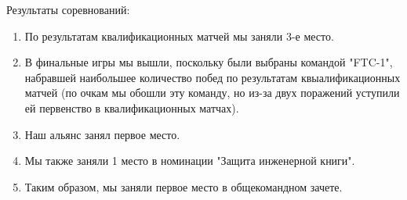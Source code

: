 Результаты соревнований:
\begin{enumerate}
	\item По результатам квалификационных матчей мы заняли 3-е место.
	
	\item В финальные игры мы вышли, поскольку были выбраны командой "FTC-1", набравшей наибольшее количество побед по результатам квыалификационных матчей (по очкам мы обошли эту команду, но из-за двух поражений уступили ей первенство в квалификационных матчах).
	
	\item Наш альянс занял первое место.
	
	\item Мы также заняли 1 место в номинации "Защита инженерной книги".
	
	\item Таким образом, мы заняли первое место в общекомандном зачете.
\end{enumerate}

